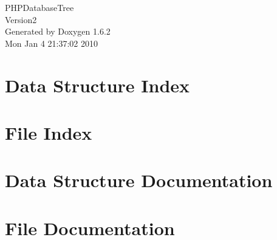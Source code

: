 \documentclass[a4paper]{book}
\begin{document}
\begin{titlepage}
\vspace*{7cm}
\begin{center}
{\Large PHPDatabaseTree \\[1ex]\large Version2 }\\
\vspace*{1cm}
{\large Generated by Doxygen 1.6.2}\\
\vspace*{0.5cm}
{\small Mon Jan 4 21:37:02 2010}\\
\end{center}
\end{titlepage}
\clearemptydoublepage
{}
\tableofcontents
\clearemptydoublepage
{}
\chapter{Data Structure Index}

\chapter{File Index}

\chapter{Data Structure Documentation}



\chapter{File Documentation}





\printindex
\end{document}
